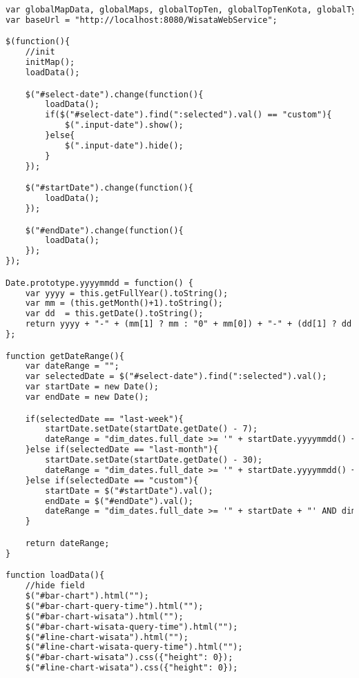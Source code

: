 \begin{lstlisting}[language=HTML,basicstyle=\tiny,caption=script-dashboard.js]
var globalMapData, globalMaps, globalTopTen, globalTopTenKota, globalTypeData, globalBarData, globalLineData;
var baseUrl = "http://localhost:8080/WisataWebService";

$(function(){
    //init
    initMap();
    loadData();

    $("#select-date").change(function(){
        loadData();
        if($("#select-date").find(":selected").val() == "custom"){
            $(".input-date").show();
        }else{
            $(".input-date").hide();
        }
    });

    $("#startDate").change(function(){
        loadData();
    });

    $("#endDate").change(function(){
        loadData();
    });
});

Date.prototype.yyyymmdd = function() {
    var yyyy = this.getFullYear().toString();
    var mm = (this.getMonth()+1).toString();
    var dd  = this.getDate().toString();
    return yyyy + "-" + (mm[1] ? mm : "0" + mm[0]) + "-" + (dd[1] ? dd : "0" + dd[0]);
};

function getDateRange(){
    var dateRange = "";
    var selectedDate = $("#select-date").find(":selected").val();
    var startDate = new Date();
    var endDate = new Date();

    if(selectedDate == "last-week"){
        startDate.setDate(startDate.getDate() - 7);
        dateRange = "dim_dates.full_date >= '" + startDate.yyyymmdd() + "' AND dim_dates.full_date <= '" + endDate.yyyymmdd() + "'";
    }else if(selectedDate == "last-month"){
        startDate.setDate(startDate.getDate() - 30);
        dateRange = "dim_dates.full_date >= '" + startDate.yyyymmdd() + "' AND dim_dates.full_date <= '" + endDate.yyyymmdd() + "'";
    }else if(selectedDate == "custom"){
        startDate = $("#startDate").val();
        endDate = $("#endDate").val();
        dateRange = "dim_dates.full_date >= '" + startDate + "' AND dim_dates.full_date <= '" + endDate + "'";
    }

    return dateRange;
}

function loadData(){
    //hide field
    $("#bar-chart").html("");
    $("#bar-chart-query-time").html("");
    $("#bar-chart-wisata").html("");
    $("#bar-chart-wisata-query-time").html("");
    $("#line-chart-wisata").html("");
    $("#line-chart-wisata-query-time").html("");
    $("#bar-chart-wisata").css({"height": 0});
    $("#line-chart-wisata").css({"height": 0});


\end{lstlisting}
